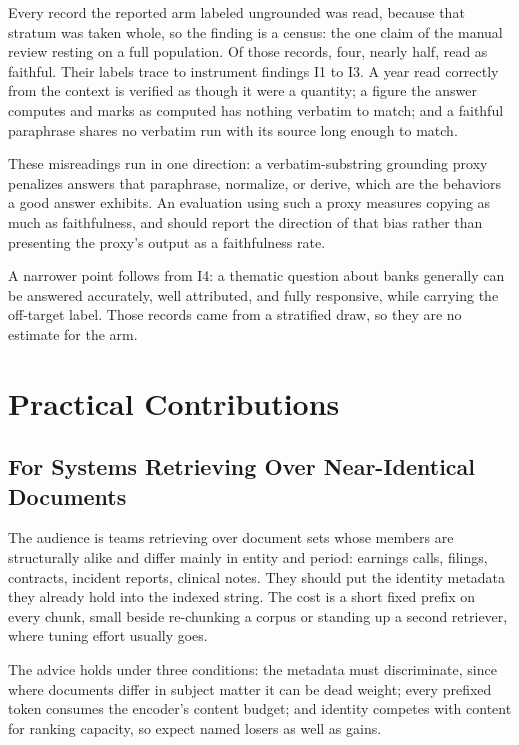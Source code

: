 Every record the reported arm labeled ungrounded was read, because that stratum
was taken whole, so the finding is a census: the one claim of the manual review
resting on a full population. Of those
\thesisQeightAnsweredUngrounded{} records, four, nearly half, read as faithful.
Their labels trace to instrument findings I1 to I3. A year read correctly from
the context is verified as though it were a quantity; a figure the answer
computes and marks as computed has nothing verbatim to match; and a faithful
paraphrase shares no verbatim run with its source long enough to match.

These misreadings run in one direction: a verbatim-substring grounding proxy
penalizes answers that paraphrase, normalize, or derive, which are the behaviors
a good answer exhibits. An evaluation using
such a proxy measures copying as much as faithfulness, and should report the
direction of that bias rather than presenting the proxy's output as a
faithfulness rate.

A narrower point follows from I4: a thematic question about banks generally can
be answered accurately, well attributed, and fully responsive, while carrying the
off-target label. Those records came from a stratified draw, so they are no
estimate for the arm.

\section{Practical Contributions}

\subsection{For Systems Retrieving Over Near-Identical Documents}

The audience is teams retrieving over document sets whose members are
structurally alike and differ mainly in entity and period: earnings calls,
filings, contracts, incident reports, clinical notes. They should put the
identity metadata they already hold into the indexed string. The cost is a
short fixed prefix on every chunk, small beside re-chunking a corpus or
standing up a second retriever, where tuning effort usually goes.

The advice holds under three conditions: the metadata must discriminate, since
where documents differ in subject matter it can be dead weight; every prefixed
token consumes the encoder's content budget; and identity competes with content
for ranking capacity, so expect named losers as well as gains.

